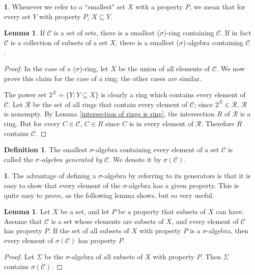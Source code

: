 \documentclass[12pt]{book}
\newcommand{\dfn}[1]{\emph{#1}\index{#1}}
\theoremstyle{definition}
\newtheorem{lemma}[theorem]{Lemma}
\newtheorem{subsec}[theorem]{}
\newtheorem{definition}[theorem]{Definition}
\begin{document}
\begin{subsec}
Whenever we refer to a ``smallest" set $X$ with a property $P$, we mean that for every set $Y$ with property $P$, $X \subseteq Y$.
\end{subsec}

\begin{lemma}
If $\mathcal C$ is a set of sets, there is a smallest ($\sigma$)-ring containing $\mathcal C$. If in fact $\mathcal C$ is a collection of subsets of a set $X$, there is a smallest ($\sigma$)-algebra containing $\mathcal C$.
\end{lemma}
\begin{proof}
In the case of a ($\sigma$)-ring, let $X$ be the union of all elements of $\mathcal C$.
We now prove this claim for the case of a ring; the other cases are similar.

The power set $2^X = \{Y: Y \subseteq X\}$ is clearly a ring which contains every element of $\mathcal C$.
Let $\mathcal R$ be the set of all rings that contain every element of $\mathcal C$; since $2^X \in \mathcal R$, $\mathcal R$ is nonempty.
By Lemma \ref{intersection of rings is ring}, the intersection $R$ of $\mathcal R$ is a ring.
But for every $C \in \mathcal C$, $C \in R$ since $C$ is in every element of $\mathcal R$.
Therefore $R$ contains $\mathcal C$.
\end{proof}

\begin{definition}
The smallest $\sigma$-algebra containing every element of a set $\mathcal C$ is called the \dfn{$\sigma$-algebra generated by} $\mathcal C$.
We denote it by $\sigma(\mathcal C)$.
\end{definition}

\begin{subsec}
The advantage of defining a $\sigma$-algebra by referring to its generators is that it is easy to show that every element of the $\sigma$-algebra has a given property.
This is quite easy to prove, as the following lemma shows, but so very useful.
\end{subsec}

\begin{lemma}
\label{generators and relations}
Let $X$ be a set, and let $P$ be a property that subsets of $X$ can have.
Assume that $\mathcal C$ is a set whose elements are subsets of $X$, and every element of $\mathcal C$ has property $P$.
If the set of all subsets of $X$ with property $P$ is a $\sigma$-algebra, then every element of $\sigma(\mathcal C)$ has property $P$.
\end{lemma}
\begin{proof}
Let $\Sigma$ be the $\sigma$-algebra of all subsets of $X$ with property $P$.
Then $\Sigma$ contains $\sigma(\mathcal C)$.
\end{proof}
\end{document}
